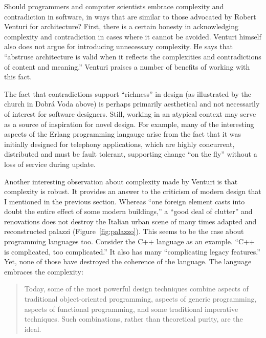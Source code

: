 Should programmers and computer scientists embrace complexity and contradiction in software,
in ways that are similar to those advocated by Robert Venturi for architecture? First, there
is a certain honesty in acknowledging complexity and contradiction in cases where it cannot
be avoided. Venturi himself also does not argue for introducing unnecessary complexity. He says
that ``abstruse architecture is valid when it reflects the complexities and contradictions of
content and meaning.'' Venturi praises a number of benefits
of working with this fact.

The fact that contradictions support ``richness'' in design (as illustrated by the church in
Dobrá Voda above) is perhaps primarily aesthetical and not necessarily of interest for software
designers. Still, working in an atypical context may serve as a source of inspiration for novel
design. For example, many of the interesting aspects of the Erlang programming langauge arise
from the fact that it was initially designed for telephony applications, which are highly
concurrent, distributed and must be fault tolerant, supporting change ``on the fly'' without
a loss of service during update.

Another interesting observation about complexity made by Venturi is that complexity is robust.
It provides an answer to the criticism of modern design that I mentioned in the previous section.
Whereas ``one foreign element casts into doubt the entire effect of some modern
buildings,'' a ``good deal of clutter'' and renovations does not destroy the
Italian urban scene of many times adapted and reconstructed palazzi (Figure~\ref{fig:palazzo}).
This seems to be the case about programming languages too. Consider the C++ language as an
example. ``C++ is complicated, too complicated.''
It also has many ``complicating legacy features.'' Yet, none of those have
destroyed the coherence of the language. The language embraces the complexity:

\begin{quote}
Today, some of the most powerful design techniques combine aspects of traditional object-oriented
programming, aspects of generic programming, aspects of functional programming, and some
traditional imperative techniques. Such combinations, rather than theoretical purity, are the
ideal.
\end{quote}

